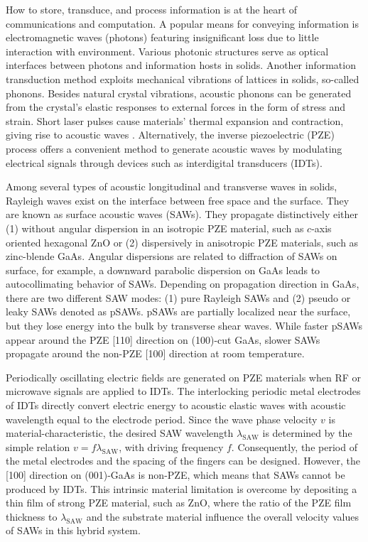 \documentclass[aps,prb,amsmath,amssymb,footinbib,showpacs,superscriptaddress]{revtex4-1}%
\begin{document}
How to store, transduce, and process information is at the heart of communications and computation. A popular means for conveying information is electromagnetic waves (photons) featuring insignificant loss due to little interaction with environment. Various photonic structures serve as optical interfaces between photons and information hosts in solids. Another information transduction method exploits mechanical vibrations of lattices in solids, so-called phonons\cite{Kittel}. Besides natural crystal vibrations, acoustic phonons can be generated  from the crystal's elastic responses to external forces in the form of stress and strain.  Short laser pulses cause materials' thermal expansion and contraction, giving rise to acoustic waves \cite{White1963}. Alternatively, the inverse piezoelectric  (PZE) process offers a convenient method to generate acoustic waves by modulating electrical signals through devices such as interdigital transducers (IDTs)\cite{White1965}.

Among several types of acoustic longitudinal and transverse waves in solids, Rayleigh waves exist on the interface between free space and the surface. They are known as surface acoustic waves (SAWs). They propagate distinctively either (1) without angular dispersion in an isotropic PZE material, such as $c$-axis oriented hexagonal ZnO\cite{Dybwad1971,Deger1998} or (2) dispersively in anisotropic PZE materials, such as zinc-blende GaAs\cite{Flannery1999, Deacon1972}.  Angular dispersions are related to diffraction of SAWs on surface, for example, a downward parabolic dispersion on GaAs leads to autocollimating behavior of SAWs\cite{Kim1994}.   
Depending on propagation direction in GaAs, there are two different SAW modes\cite{Flannery1999, Deacon1972}: (1) pure Rayleigh SAWs and (2) pseudo or leaky SAWs denoted as pSAWs. pSAWs are partially localized near the surface, but they lose energy into the bulk by transverse shear waves\cite{Hunt1986}. While faster pSAWs appear around the PZE [110] direction on (100)-cut GaAs, slower SAWs  propagate around the non-PZE [100] direction at room temperature\cite{Flannery1999, Deacon1972}. 

Periodically oscillating electric fields are generated on PZE materials when RF or microwave signals are applied to IDTs. The interlocking periodic metal electrodes of IDTs directly convert electric energy to acoustic elastic waves with acoustic wavelength equal to the electrode period\cite{White1965}. Since the wave phase velocity $v$ is material-characteristic, the desired SAW wavelength $\lambda_\text{SAW}$ is determined by the simple relation $v = f \lambda_\text{SAW}$, with driving frequency $f$. Consequently, the period of the metal electrodes and the spacing of the fingers can be designed. However, the [100] direction on (001)-GaAs is non-PZE, which means that SAWs cannot be produced by IDTs. 
This intrinsic material limitation is overcome by depositing a thin film of strong PZE material, such as ZnO, where
the ratio of the PZE film thickness to $\lambda_\text{SAW}$ and the substrate material influence the overall velocity values of SAWs in this hybrid system\cite{Du2008}.  
\end{document}
